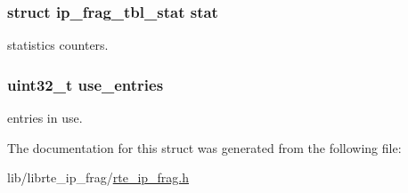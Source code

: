 \subsubsection[{stat}]{\setlength{\rightskip}{0pt plus 5cm}struct {\bf ip\+\_\+frag\+\_\+tbl\+\_\+stat} stat}\label{structrte__ip__frag__tbl_a92286e54c27d08e716c496680e412cb5}
statistics counters. \hypertarget{structrte__ip__frag__tbl_a4df078fc42bb1b234bd10b40546071ed}{}
\subsubsection[{use\+\_\+entries}]{\setlength{\rightskip}{0pt plus 5cm}uint32\+\_\+t use\+\_\+entries}\label{structrte__ip__frag__tbl_a4df078fc42bb1b234bd10b40546071ed}
entries in use. 

The documentation for this struct was generated from the following file\+:\begin{DoxyCompactItemize}
\item 
lib/librte\+\_\+ip\+\_\+frag/\hyperlink{rte__ip__frag_8h}{rte\+\_\+ip\+\_\+frag.\+h}\end{DoxyCompactItemize}

